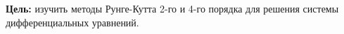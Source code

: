 \Introduction

\textbf{Цель:} изучить методы Рунге-Кутта 2-го и 4-го порядка для решения системы дифференциальных уравнений.

